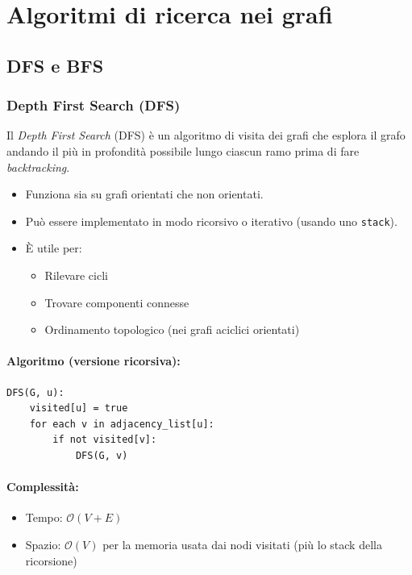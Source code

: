 \section{Algoritmi di ricerca nei grafi}
\subsection*{DFS e BFS}
\subsubsection*{Depth First Search (DFS)}

Il \textit{Depth First Search} (DFS) è un algoritmo di visita dei grafi che esplora il grafo andando il più in profondità possibile lungo ciascun ramo prima di fare \textit{backtracking}.

\begin{itemize}
    \item Funziona sia su grafi orientati che non orientati.
    \item Può essere implementato in modo ricorsivo o iterativo (usando uno \texttt{stack}).
    \item È utile per:
    \begin{itemize}
        \item Rilevare cicli
        \item Trovare componenti connesse
        \item Ordinamento topologico (nei grafi aciclici orientati)
    \end{itemize}
\end{itemize}

\paragraph{Algoritmo (versione ricorsiva):}

\begin{verbatim}
DFS(G, u):
    visited[u] = true
    for each v in adjacency_list[u]:
        if not visited[v]:
            DFS(G, v)
\end{verbatim}

\paragraph{Complessità:}
\begin{itemize}
    \item Tempo: $\mathcal{O}(V + E)$
    \item Spazio: $\mathcal{O}(V)$ per la memoria usata dai nodi visitati (più lo stack della ricorsione)
\end{itemize}

